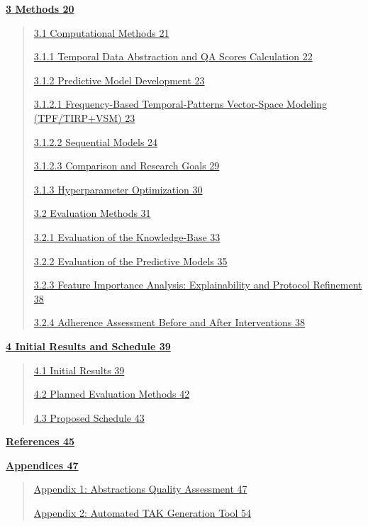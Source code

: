 \documentclass[
]{article}
\begin{document}
\hyperref[methods]{\textbf{3 Methods 20}}

\begin{quote}
\hyperref[computational-methods]{3.1 Computational Methods 21}

\hyperref[temporal-data-abstraction-and-qa-scores-calculation]{3.1.1
Temporal Data Abstraction and QA Scores Calculation 22}

\hyperref[predictive-model-development]{3.1.2 Predictive Model
Development 23}

\hyperref[frequency-based-temporal-patterns-vector-space-modeling-tpftirpvsm]{3.1.2.1
Frequency-Based Temporal-Patterns Vector-Space Modeling (TPF/TIRP+VSM)
23}

\hyperref[sequential-models]{3.1.2.2 Sequential Models 24}

\hyperref[comparison-and-research-goals]{3.1.2.3 Comparison and Research
Goals 29}

\hyperref[hyperparameter-optimization]{3.1.3 Hyperparameter Optimization
30}

\hyperref[evaluation-methods]{3.2 Evaluation Methods 31}

\hyperref[evaluation-of-the-knowledge-base]{3.2.1 Evaluation of the
Knowledge-Base 33}

\hyperref[evaluation-of-the-predictive-models]{3.2.2 Evaluation of the
Predictive Models 35}

\hyperref[feature-importance-analysis-explainability-and-protocol-refinement]{3.2.3
Feature Importance Analysis: Explainability and Protocol Refinement 38}

\hyperref[adherence-assessment-before-and-after-interventions]{3.2.4
Adherence Assessment Before and After Interventions 38}
\end{quote}

\hyperref[initial-results-and-schedule]{\textbf{4 Initial Results and
Schedule 39}}

\begin{quote}
\hyperref[initial-results]{4.1 Initial Results 39}

\hyperref[planned-evaluation-methods]{4.2 Planned Evaluation Methods 42}

\hyperref[proposed-schedule]{4.3 Proposed Schedule 43}
\end{quote}

\hyperref[references]{\textbf{References 45}}

\hyperref[appendices]{\textbf{Appendices 47}}

\begin{quote}
\hyperref[appendix-1-abstractions-quality-assessment]{Appendix 1:
Abstractions Quality Assessment 47}

\hyperref[appendix-2-automated-tak-generation-tool]{Appendix 2:
Automated TAK Generation Tool 54}
\end{quote}
\end{document}
